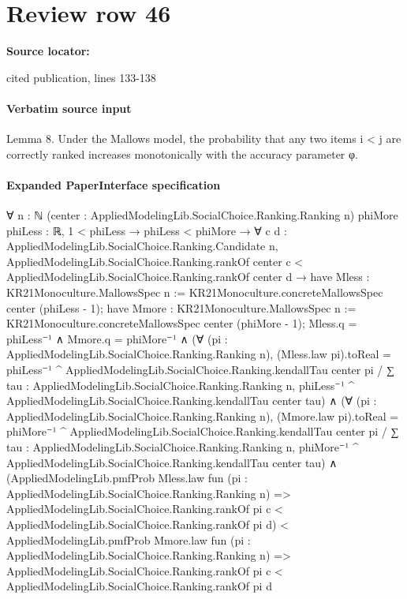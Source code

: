 \documentclass[10pt]{article}
\begin{document}
\section*{Review row 46}
\textbf{Source locator:} {\footnotesize\raggedright cited publication, lines 133-\allowbreak{}138\par}
\paragraph{Verbatim source input}
\begin{ReviewVerbatim}
Lemma 8. Under the Mallows model, the probability that any two items i < j are correctly ranked increases
monotonically with the accuracy parameter φ.
\end{ReviewVerbatim}



\paragraph{Expanded PaperInterface specification}
\begin{ReviewVerbatim}
∀ {n : ℕ} (center : AppliedModelingLib.SocialChoice.Ranking.Ranking n) {phiMore phiLess : ℝ},
  1 < phiLess →
    phiLess < phiMore →
      ∀ {c d : AppliedModelingLib.SocialChoice.Ranking.Candidate n},
        AppliedModelingLib.SocialChoice.Ranking.rankOf center c <
            AppliedModelingLib.SocialChoice.Ranking.rankOf center d →
          have Mless : KR21Monoculture.MallowsSpec n := KR21Monoculture.concreteMallowsSpec center (phiLess - 1);
          have Mmore : KR21Monoculture.MallowsSpec n := KR21Monoculture.concreteMallowsSpec center (phiMore - 1);
          Mless.q = phiLess⁻¹ ∧
            Mmore.q = phiMore⁻¹ ∧
              (∀ (pi : AppliedModelingLib.SocialChoice.Ranking.Ranking n),
                  (Mless.law pi).toReal =
                    phiLess⁻¹ ^ AppliedModelingLib.SocialChoice.Ranking.kendallTau center pi /
                      ∑ tau : AppliedModelingLib.SocialChoice.Ranking.Ranking n,
                        phiLess⁻¹ ^ AppliedModelingLib.SocialChoice.Ranking.kendallTau center tau) ∧
                (∀ (pi : AppliedModelingLib.SocialChoice.Ranking.Ranking n),
                    (Mmore.law pi).toReal =
                      phiMore⁻¹ ^ AppliedModelingLib.SocialChoice.Ranking.kendallTau center pi /
                        ∑ tau : AppliedModelingLib.SocialChoice.Ranking.Ranking n,
                          phiMore⁻¹ ^ AppliedModelingLib.SocialChoice.Ranking.kendallTau center tau) ∧
                  (AppliedModelingLib.pmfProb Mless.law fun (pi : AppliedModelingLib.SocialChoice.Ranking.Ranking n) =>
                      AppliedModelingLib.SocialChoice.Ranking.rankOf pi c <
                        AppliedModelingLib.SocialChoice.Ranking.rankOf pi d) <
                    AppliedModelingLib.pmfProb Mmore.law fun (pi : AppliedModelingLib.SocialChoice.Ranking.Ranking n) =>
                      AppliedModelingLib.SocialChoice.Ranking.rankOf pi c <
                        AppliedModelingLib.SocialChoice.Ranking.rankOf pi d
\end{ReviewVerbatim}
\end{document}
